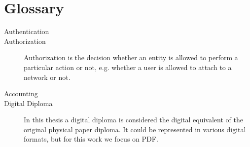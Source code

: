 \chapter*{Glossary}


\begin{description}
  \item[Authentication] 
  \item[Authorization] Authorization is the decision whether an entity is allowed to perform a particular action or not, 
       e.g. whether a user is allowed to attach to a network or not.
  \item[Accounting]
  \item[Digital Diploma] In this thesis a digital diploma is considered the digital equivalent of the original physical paper diploma. It could be represented in various digital formats, but for this work we focus on PDF.
\end{description}
